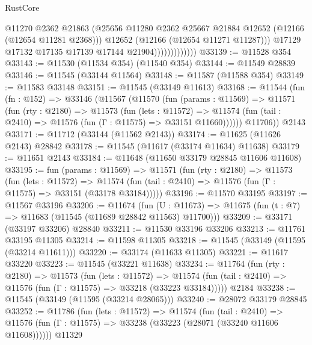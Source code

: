 \begin{lexlean}{RustCore}
\begin{coremodule}
                                @11270
                                @2362
                                @21863
                                (@25656
                                  @11280
                                  @2362
                                  @25667
                                  @21884
                                  @12652
                                  (@12166 (@12654 @11281 @2368)))
                                @12652
                                (@12166 (@12654 @11271 @11287)))
                              @17129
                              @17132
                              @17135
                              @17139
                              @17144
                              @21904)))))))))))))
@33139 := @11528 @354
@33143 := @11530 (@11534 @354) (@11540 @354)
@33144 := @11549 @28839
@33146 := @11545 (@33144 @11564)
@33148 := @11587 (@11588 @354)
@33149 := @11583 @33148
@33151 := @11545 (@33149 @11613)
@33168 := @11544
    (fun (fn : @152) =>
    @33146
      (@11567
        (@11570
          (fun (params : @11569) =>
          @11571
            (fun (rty : @2180) =>
            @11573
              (fun (lets : @11572) =>
              @11574 (fun (tail : @2410) => @11576 (fun (Γ : @11575) => @33151 @11660))))))
        @11706))
    @2143
@33171 := @11712 (@33144 (@11562 @2143))
@33174 := @11625 (@11626 @2143) @28842
@33178 := @11545 (@11617 (@33174 @11634) @11638)
@33179 := @11651 @2143
@33184 := @11648 (@11650 @33179 @28845 @11606 @11608)
@33195 := fun (params : @11569) =>
  @11571
    (fun (rty : @2180) =>
    @11573
      (fun (lets : @11572) =>
      @11574 (fun (tail : @2410) => @11576 (fun (Γ : @11575) => @33151 (@33178 @33184)))))
@33196 := @11570 @33195
@33197 := @11567 @33196
@33206 := @11674
    (fun (U : @11673) => @11675 (fun (t : @7) => @11683 (@11545 (@11689 @28842 @11563) @11700)))
@33209 := @33171 (@33197 @33206) @28840
@33211 := @11530 @33196 @33206
@33213 := @11761 @33195 @11305
@33214 := @11598 @11305
@33218 := @11545 (@33149 (@11595 (@33214 @11611)))
@33220 := @33174 (@11633 @11305)
@33221 := @11617 @33220
@33223 := @11545 (@33221 @11638)
@33234 := @11764
    (fun (rty : @2180) =>
    @11573
      (fun (lets : @11572) =>
      @11574 (fun (tail : @2410) => @11576 (fun (Γ : @11575) => @33218 (@33223 @33184)))))
    @2184
@33238 := @11545 (@33149 (@11595 (@33214 @28065)))
@33240 := @28072 @33179 @28845
@33252 := @11786
    (fun (lets : @11572) =>
    @11574
      (fun (tail : @2410) =>
      @11576 (fun (Γ : @11575) => @33238 (@33223 (@28071 (@33240 @11606 @11608))))))
    @11329

\end{coremodule}
\end{lexlean}
